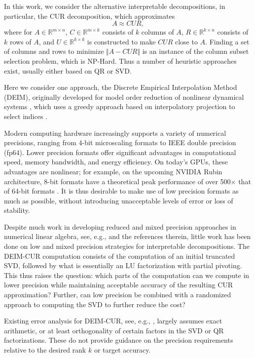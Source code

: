 \documentclass[12pt, a4paper]{article}
\theoremstyle{remark}
\begin{document}
In this work, we consider the alternative interpretable decompositions, in particular, the CUR decomposition, which approximates
\begin{equation*}
A \approx CUR,
\end{equation*}
where for $A\in\mathbb{R}^{m\times n}$, $C\in\mathbb{R}^{m\times k}$ consists of $k$ columns of $A$, $R\in\mathbb{R}^{k\times n}$ consists of $k$ rows of $A$, and $U \in \mathbb{R}^{k \times k}$ is constructed to make $CUR$ close to $A$. Finding a set of columns and rows to minimize $\Vert A-CUR\Vert$ is an instance of the column subset selection problem, which is NP-Hard. Thus a number of heuristic approaches exist, usually either based on QR or SVD.

Here we consider one approach, the Discrete Empirical Interpolation Method (DEIM), originally developed for model order reduction of nonlinear dynamical systems \cite{chaturantabut2010nonlinear}, which uses a greedy approach based on interpolatory projection to select indices \cite{sorensen2016deim}. \par

Modern computing hardware increasingly supports a variety of numerical precisions, ranging from 4-bit microscaling formats to IEEE double precision (fp64). Lower precision formats offer significant advantages in computational speed, memory bandwidth, and energy efficiency. On today's GPUs, these advantages are nonlinear; for example, on the upcoming NVIDIA Rubin architecture, 8-bit formats have a theoretical peak performance of over 500$\times$ that of 64-bit formats \cite{nvidia_vera_rubin_nvl72_2026}.
It is thus desirable to make use of low precision formats as much as possible, without introducing unacceptable levels of error or loss of stability. 


Despite much work in developing reduced and mixed precision approaches in numerical linear algebra, see, e.g., \cite{higham2022mixed} and the references therein, little work has been done on low and mixed precision strategies for interpretable decompositions. The  DEIM-CUR computation consists of the computation of an initial truncated SVD, followed by what is essentially an LU factorization with partial pivoting. This thus raises the question: which parts of the computation can we compute in lower precision while maintaining acceptable accuracy of the resulting CUR approximation? Further, can low precision be combined with a randomized approach to computing the SVD to further reduce the cost? 

Existing error analysis for DEIM-CUR, see, e.g., \cite{sorensen2016deim, drmac2016new}, largely assumes exact arithmetic, or at least orthogonality of certain factors in the SVD or QR factorizations. These do not provide guidance on the precision requirements relative to the desired rank $k$ or target accuracy.
\end{document}

